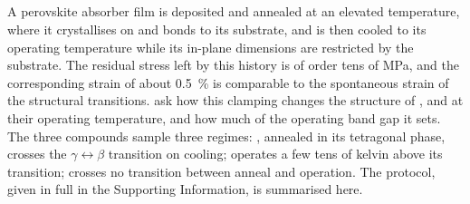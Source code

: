 

\subsection{\protect{}}
\label{si:clamp-detail}
{\changedcolor
A perovskite absorber film is deposited and annealed at an elevated temperature, where it
crystallises on and bonds to its substrate, and is then cooled to its operating temperature
while its in-plane dimensions are restricted by the substrate. The residual stress left by this
history is of order tens of MPa,\cite{Rolston2018AEM, ref_processing_temp} and the corresponding
strain of about \SI{0.5}{\percent}\cite{Zhao2017SciAdv} is comparable to the spontaneous strain of
the structural transitions.  ask how this clamping changes the structure of \CsSnI{}, \MASnI{} and \FASnI{} at their operating
temperature, and how much of the operating band gap it sets. The three compounds sample three
regimes: \CsSnI{}, annealed in its tetragonal phase, crosses the $\gamma\leftrightarrow\beta$
transition on cooling; \MASnI{} operates a few tens of kelvin above its transition; \FASnI{} crosses
no transition between anneal and operation. The protocol, given in full in the Supporting
Information, is summarised here.

}
